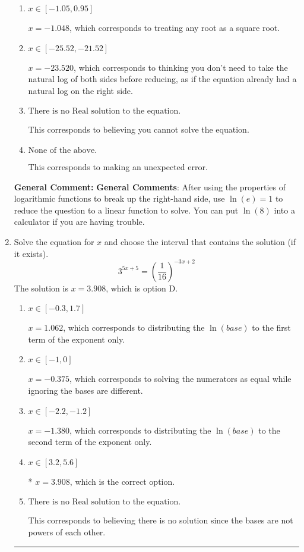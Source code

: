 \documentclass{extbook}[14pt]
\newcommand{\litem}[1]{\item #1

\rule{\textwidth}{0.4pt}}
\begin{document}
\begin{enumerate}
{\begin{enumerate}[label=\Alph*.]
* $x = -2.616$, which is the correct option.
\item \( x \in [-1.05, 0.95] \)

$x = -1.048$, which corresponds to treating any root as a square root.
\item \( x \in [-25.52, -21.52] \)

$x = -23.520$, which corresponds to thinking you don't need to take the natural log of both sides before reducing, as if the equation already had a natural log on the right side.
\item \( \text{There is no Real solution to the equation.} \)

This corresponds to believing you cannot solve the equation.
\item \( \text{None of the above.} \)

This corresponds to making an unexpected error.
\end{enumerate}

\textbf{General Comment:} \textbf{General Comments}: After using the properties of logarithmic functions to break up the right-hand side, use $\ln(e) = 1$ to reduce the question to a linear function to solve. You can put $\ln(8)$ into a calculator if you are having trouble.
}
\litem{
Solve the equation for $x$ and choose the interval that contains the solution (if it exists).
\[ 3^{5x+5} = \left(\frac{1}{16}\right)^{-3x+2} \]
The solution is \( x = 3.908 \), which is option D.\begin{enumerate}[label=\Alph*.]
\item \( x \in [-0.3, 1.7] \)

$x = 1.062$, which corresponds to distributing the $\ln(base)$ to the first term of the exponent only.
\item \( x \in [-1, 0] \)

$x = -0.375$, which corresponds to solving the numerators as equal while ignoring the bases are different.
\item \( x \in [-2.2, -1.2] \)

$x = -1.380$, which corresponds to distributing the $\ln(base)$ to the second term of the exponent only.
\item \( x \in [3.2, 5.6] \)

* $x = 3.908$, which is the correct option.
\item \( \text{There is no Real solution to the equation.} \)

This corresponds to believing there is no solution since the bases are not powers of each other.
\end{enumerate}

}
\end{enumerate}
\end{document}
